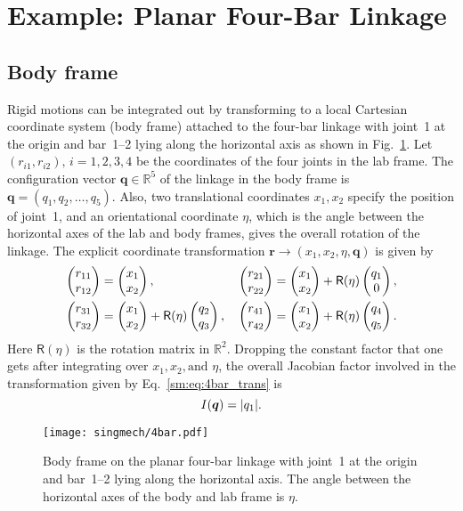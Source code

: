 \section{Example: Planar Four-Bar Linkage}
\label{sm:sec:4bar}

\subsection{Body frame}

Rigid motions can be integrated out by transforming to a local Cartesian coordinate system (body frame) attached to the four-bar linkage with joint~1 at the origin and bar~1--2 lying along the horizontal axis as shown in Fig.~\ref{sm:fig:4bar}.
Let $(r_{i1}, r_{i2}),\, i = 1, 2, 3, 4$ be the coordinates of the four joints in the lab frame.
The configuration vector $\bm{q} \in \mathbb{R}^{5}$ of the linkage in the body frame is $\bm{q} = (q_{1}, q_{2}, \ldots, q_{5})$.
Also, two translational coordinates $x_{1}, x_{2}$ specify the position of joint~1, and an orientational coordinate $\eta$, which is the angle between the horizontal axes of the lab and body frames, gives the overall rotation of the linkage.
The explicit coordinate transformation $\bm{r} \to (x_{1}, x_{2}, \eta, \bm{q})$ is given by
%
\begin{equation}
  \begin{aligned}
    \begin{pmatrix}r_{11} \\ r_{12}\end{pmatrix} &= \begin{pmatrix}x_{1} \\ x_{2}\end{pmatrix}, {}&
    \begin{pmatrix}r_{21} \\ r_{22}\end{pmatrix} &= \begin{pmatrix}x_{1} \\ x_{2}\end{pmatrix} + \mathsf{R}(\eta)\begin{pmatrix}q_1 \\ 0\end{pmatrix},\\
    \begin{pmatrix}r_{31} \\ r_{32}\end{pmatrix} &= \begin{pmatrix}x_{1} \\ x_{2}\end{pmatrix} + \mathsf{R}(\eta)\begin{pmatrix}q_2 \\ q_3\end{pmatrix}, {}&
    \begin{pmatrix}r_{41} \\ r_{42}\end{pmatrix} &= \begin{pmatrix}x_{1} \\ x_{2}\end{pmatrix} + \mathsf{R}(\eta)\begin{pmatrix}q_4 \\ q_5\end{pmatrix}.
  \end{aligned}
  \label{sm:eq:4bar_trans}
\end{equation}
%
Here $\mathsf{R}(\eta)$ is the rotation matrix in $\mathbb{R}^2$.
Dropping the constant factor that one gets after integrating over $x_1, x_2, \text{and } \eta$, the overall Jacobian factor involved in the transformation given by Eq.~\eqref{sm:eq:4bar_trans} is
%
\begin{equation}
  I(\bm{q}) = \lvert q_1\rvert.
  \label{sm:eq:4bar_jacobian}
\end{equation}
%
\begin{figure}
  \begin{center}
    \texttt{[image: singmech/4bar.pdf]}
  \end{center}
  \caption{Body frame on the planar four-bar linkage with joint~1 at the origin and bar~1--2 lying along the horizontal axis.
    The angle between the horizontal axes of the body and lab frame is $\eta$.}
  \label{sm:fig:4bar}
\end{figure}

